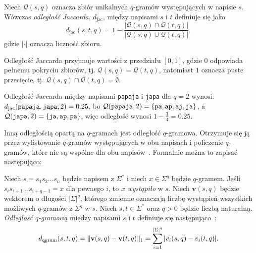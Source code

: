 \documentclass{praca1}
\DeclarePairedDelimiter{\norm}{\lVert}{\rVert}
\begin{document}
\begin{definition}
Niech $\mathcal{Q}(s,q)$ oznacza zbiór unikalnych $q$-gramów występujących w napisie $s$. Wówczas \emph{odległość Jaccarda}, $d_{\mathrm{jac}}$, między napisami $s$ i $t$ definiuje się jako
\begin{equation*}
d_{\mathrm{jac}}(s,t,q) = 1 - \frac{|\mathcal{Q}(s,q) \cap \mathcal{Q}(t,q)|}{|\mathcal{Q}(s,q) \cup \mathcal{Q}(t,q)|},
\end{equation*}
gdzie $|\cdot|$ oznacza liczność zbioru.
\end{definition} 

Odległość Jaccarda przyjmuje wartości z przedziału $[0,1]$, gdzie $0$ odpowiada pełnemu pokryciu zbiorów, tj. $\mathcal{Q}(s,q) = \mathcal{Q}(t,q)$, natomiast $1$ oznacza puste przecięcie, tj. $\mathcal{Q}(s,q) \cap \mathcal{Q}(t,q) = \emptyset$.

\begin{example}
Odległość Jaccarda między napisami \verb|papaja| i \verb|japa| dla $q = 2$ wynosi: $d_{\mathrm{jac}}(\verb|papaja|, \verb|japa|, 2)  = 0.25$, bo $\mathcal{Q}(\verb|papaja|, 2) = \{\verb|pa|, \verb|ap|, \verb|aj|, \verb|ja|\}$, a $\mathcal{Q}(\verb|japa|, 2) = \{\verb|ja|, \verb|ap|, \verb|pa|\}$, więc odległość wynosi $1 - \frac{3}{4} = 0.25$.
\end{example}


Inną odległością opartą na $q$-gramach jest odległość $q$-gramowa. Otrzymuje się ją przez wylistowanie $q$-gramów występujących w obu napisach i policzenie $q$-gramów, które nie są wspólne dla obu napisów~\cite{Loo2014:stringdist}. Formalnie można to zapisać następująco:

\begin{definition}
Niech $s = s_1 s_2 \ldots s_n$ będzie napisem z $\Sigma^*$ i niech $x \in \Sigma^q$ będzie $q$-gramem. Jeśli $s_i s_{i+1} \ldots s_{i+q-1} = x$ dla pewnego $i$, to $x$ \emph{wystąpiło} w $s$. Niech $\mathbf{v}(s,q)$ będzie wektorem o długości $|\Sigma|^q$, którego zmienne oznaczają liczbę wystąpień wszystkich możliwych $q$-gramów z $\Sigma^q$ w $s$. Niech $s, t \in \Sigma^*$ oraz $q>0$ będzie liczbą naturalną. \emph{Odległość $q$-gramową} między napisami $s$ i $t$ definiuje się następująco~\cite{Ukkonen1992:approxqgrams}:
\begin{equation}
\label{eq:009}
d_{\mathtt{q}\mathrm{gram}}(s,t,q) = \norm{\mathbf{v}(s,q) - \mathbf{v}(t,q)}_1 = \sum\limits_{i = 1}^{|\Sigma|^q} |v_i(s,q) - v_i(t,q)|.
\end{equation}
\end{definition} 
\end{document}
